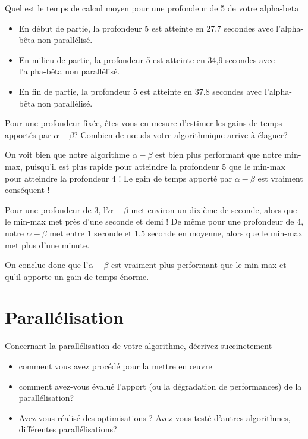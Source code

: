 \documentclass[a4paper, 11pt]{article}
\begin{document}
Quel est le temps de calcul moyen pour une profondeur de 5 de votre
alpha-beta 
\begin{itemize}
\item En début de partie, la profondeur 5 est atteinte en 27,7 secondes avec l'alpha-bêta non parallélisé.
\item En milieu de partie, la profondeur 5 est atteinte en 34,9 secondes avec l'alpha-bêta non parallélisé.
\item En fin de partie, la profondeur 5 est atteinte en 37.8 secondes avec l'alpha-bêta non parallélisé.
\end{itemize}

\vspace{.5cm}
Pour une profondeur fixée, êtes-vous en mesure d'estimer les gains de temps
apportés par $\alpha-\beta$? Combien de n\oe uds votre algorithmique arrive
à élaguer?

\vspace{.5cm}
 On voit bien que notre algorithme $\alpha-\beta$ est bien plus performant que notre min-max, puisqu'il est plus rapide pour atteindre la profondeur 5 que le min-max pour atteindre la profondeur 4 ! Le gain de temps apporté par $\alpha-\beta$ est vraiment conséquent !

Pour une profondeur de 3, l'$\alpha-\beta$ met environ un dixième de seconde, alors que le min-max met près d'une seconde et demi !
De même pour une profondeur de 4, notre $\alpha-\beta$ met entre 1 seconde et 1,5 seconde en moyenne, alors que le min-max met plus d'une minute.

On conclue donc que l'$\alpha-\beta$ est vraiment plus performant que le min-max et qu'il apporte un gain de temps énorme.

\vspace{2cm}

\section{Parallélisation}

Concernant la parallélisation de votre algorithme,
décrivez succinctement 
\begin{itemize}
\item comment vous avez procédé pour la mettre en œuvre
\item comment avez-vous évalué l'apport (ou la dégradation de
  performances) de la parallélisation?
\item Avez vous réalisé des optimisations ? Avez-vous testé d'autres
  algorithmes, différentes parallélisations?
\end{itemize}
\end{document}
